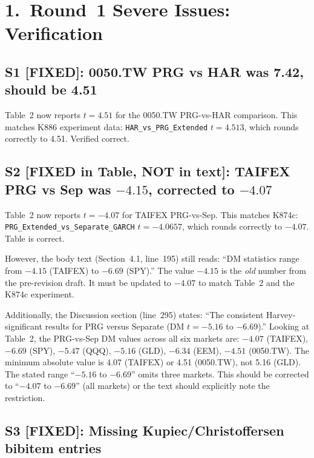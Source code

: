 \documentclass[12pt,a4paper]{article}
\begin{document}
\section*{1.\ Round~1 Severe Issues: Verification}

\subsection*{\textcolor{okgreen}{S1 [FIXED]: 0050.TW PRG vs HAR was 7.42, should be 4.51}}

Table~2 now reports $t = 4.51$ for the 0050.TW PRG-vs-HAR comparison. This matches K886 experiment data: \texttt{HAR\_vs\_PRG\_Extended} $t = 4.513$, which rounds correctly to 4.51. \textcolor{okgreen}{Verified correct.}

\subsection*{\textcolor{okgreen}{S2 [FIXED in Table, NOT in text]: TAIFEX PRG vs Sep was $-4.15$, corrected to $-4.07$}}

Table~2 now reports $t = -4.07$ for TAIFEX PRG-vs-Sep. This matches K874c: \texttt{PRG\_Extended\_vs\_Separate\_GARCH} $t = -4.0657$, which rounds correctly to $-4.07$. \textcolor{okgreen}{Table is correct.}

\textcolor{errorred}{However, the body text (Section~4.1, line~195) still reads: ``DM statistics range from $-4.15$ (TAIFEX) to $-6.69$ (SPY).''} The value $-4.15$ is the \emph{old} number from the pre-revision draft. It must be updated to $-4.07$ to match Table~2 and the K874c experiment.

Additionally, the Discussion section (line~295) states: ``The consistent Harvey-significant results for PRG versus Separate (DM $t = -5.16$ to $-6.69$).'' Looking at Table~2, the PRG-vs-Sep DM values across all six markets are: $-4.07$ (TAIFEX), $-6.69$ (SPY), $-5.47$ (QQQ), $-5.16$ (GLD), $-6.34$ (EEM), $-4.51$ (0050.TW). The minimum absolute value is 4.07 (TAIFEX) or 4.51 (0050.TW), not 5.16 (GLD). The stated range ``$-5.16$ to $-6.69$'' omits three markets. This should be corrected to ``$-4.07$ to $-6.69$'' (all markets) or the text should explicitly note the restriction.

\subsection*{\textcolor{okgreen}{S3 [FIXED]: Missing Kupiec/Christoffersen bibitem entries}}
\end{document}
